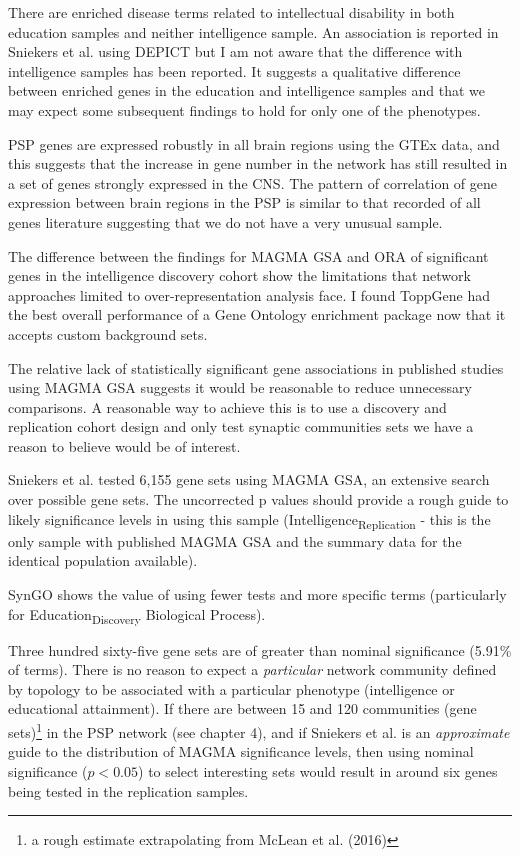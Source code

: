 There are enriched disease terms related to intellectual disability in both education samples and neither intelligence sample. An association is reported in Sniekers et al. \cite{sniekers2017genome} using DEPICT but I am not aware that the difference with intelligence samples has been reported. It suggests a qualitative difference between enriched genes in the education and intelligence samples and that we may expect some subsequent findings to hold for only one of the phenotypes.  




PSP genes are expressed robustly in all brain regions using the GTEx data, and this suggests that the increase in gene number in the network has still resulted in a set of genes strongly expressed in the CNS. The pattern of correlation of gene expression between brain regions in the PSP is similar to that recorded of all genes literature \cite{mele2015human} suggesting that we do not have a very unusual sample.  

The difference between the findings for MAGMA GSA and ORA of significant genes in the intelligence discovery cohort show the limitations that network approaches limited to over-representation analysis face\cite{ghiassian2015disease}. I found ToppGene\cite{chen2009disease} had the best overall performance of a Gene Ontology enrichment package now that it accepts custom background sets. 

The relative lack of statistically significant gene associations in published studies using MAGMA GSA suggests it would be reasonable to reduce unnecessary comparisons. A reasonable way to achieve this is to use a discovery and replication cohort design and only test synaptic communities sets we have a reason to believe would be of interest. 

Sniekers et al.\cite{sniekers2017genome} tested 6,155 gene sets using MAGMA GSA, an extensive search over possible gene sets. The uncorrected p values should provide a rough guide to likely significance levels in using this sample (Intelligence\textsubscript{Replication} - this is the only sample with published MAGMA GSA and the summary data for the identical population available).

SynGO shows the value of using fewer tests and more specific terms (particularly for Education\textsubscript{Discovery} Biological Process).



Three hundred sixty-five gene sets are of greater than nominal significance (5.91\% of terms). There is no reason to expect a \textit{particular} network community defined by topology to be associated with a particular phenotype (intelligence or educational attainment). If there are between 15 and 120 communities (gene sets)\footnote{a rough estimate extrapolating from McLean et al. (2016)} in the PSP network (see chapter 4), and if Sniekers et al. is an \textit{approximate} guide to the distribution of MAGMA significance levels, then using nominal significance ($p<0.05$) to select interesting sets would result in around six genes being tested in the replication samples. 

